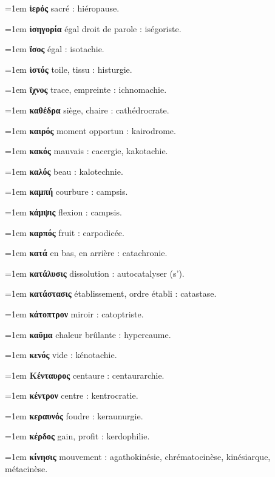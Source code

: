 \hangindent=1em \textbf{ἱερός} sacré : hiéropause.\par
\hangindent=1em \textbf{ἰσηγορία} égal droit de parole : iségoriste.\par
\hangindent=1em \textbf{ἴσος} égal : isotachie.\par
\hangindent=1em \textbf{ἱστός} toile, tissu : histurgie.\par
\hangindent=1em \textbf{ἴχνος} trace, empreinte : ichnomachie.\par
\hangindent=1em \textbf{καθέδρα} siège, chaire : cathédrocrate.\par
\hangindent=1em \textbf{καιρός} moment opportun : kairodrome.\par
\hangindent=1em \textbf{κακός} mauvais : cacergie, kakotachie.\par
\hangindent=1em \textbf{καλός} beau : kalotechnie.\par
\hangindent=1em \textbf{καμπή} courbure : campsis.\par
\hangindent=1em \textbf{κάμψις} flexion : campsis.\par
\hangindent=1em \textbf{καρπός} fruit : carpodicée.\par
\hangindent=1em \textbf{κατά} en bas, en arrière : catachronie.\par
\hangindent=1em \textbf{κατάλυσις} dissolution : autocatalyser (s').\par
\hangindent=1em \textbf{κατάστασις} établissement, ordre établi : catastase.\par
\hangindent=1em \textbf{κάτοπτρον} miroir : catoptriste.\par
\hangindent=1em \textbf{καῦμα} chaleur brûlante : hypercaume.\par
\hangindent=1em \textbf{κενός} vide : kénotachie.\par
\hangindent=1em \textbf{Κένταυρος} centaure : centaurarchie.\par
\hangindent=1em \textbf{κέντρον} centre : kentrocratie.\par
\hangindent=1em \textbf{κεραυνός} foudre : keraunurgie.\par
\hangindent=1em \textbf{κέρδος} gain, profit : kerdophilie.\par
\hangindent=1em \textbf{κίνησις} mouvement : agathokinésie, chrématocinèse, kinésiarque, métacinèse.\par
